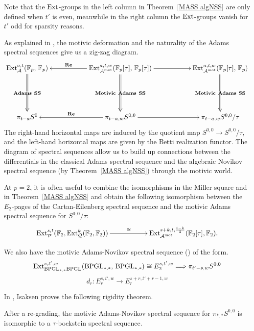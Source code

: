 \begin{rmk}  
  Note that the $\operatorname{\mathrm{Ext}}$-groups in the left column in Theorem~\ref{MASS algNSS} are only defined when $t'$ is even, meanwhile in the right column the $\operatorname{\mathrm{Ext}}$-groups vanish for $t'$ odd for sparsity reasons.
\end{rmk}

As explained in \cite[Subsection~1.3]{GWX}, the motivic deformation and the naturality of the Adams spectral sequences give us a zig-zag diagram.
\begin{displaymath}
  \xymatrix{
\Ext_{\A}^{a,t}(\F_p,\, \F_p) \ar@{=>}[dd]|{\mathbf{Adams \ SS}}  & & 
  \Ext^{a,t,w}_{\A^\textup{mot}}(\F_p[\tau],\, \F_p[\tau]) \ar[ll]_-{\mathbf{Re}} \ar[rr] \ar@{=>}[dd]|{\mathbf{Motivic \ Adams \ SS}} & & 
   \Ext^{a,t,w}_{\A^\textup{mot}}(\F_p[\tau],\, \F_p)   \ar@{=>}[dd]|{\mathbf{Motivic \ Adams \ SS}} \\
 & & & & \\
 \pi_{t-a}S^0 & & \pi_{t-a,w}S^{0,0} \ar[ll]_-{\mathbf{Re}} \ar[rr] & & \pi_{t-a,w}S^{0,0}/\tau
}
\end{displaymath}
The right-hand horizontal maps are induced by the quotient map $S^{0,0} \rightarrow S^{0,0}/\tau$, and
the left-hand horizontal maps are given by the Betti realization functor.
The diagram of spectral sequences allow us to build up connections between the differentials in the classical Adams spectral sequence and the algebraic Novikov spectral sequence (by Theorem~\ref{MASS algNSS}) through the motivic world.

\begin{rmk} \label{tridegree}
At $p=2$, it is often useful to combine the isomorphisms in the Miller square and in Theorem~\ref{MASS algNSS} and obtain the following isomorphism between the $E_2$-pages of the Cartan-Eilenberg spectral sequence and the motivic Adams spectral sequence for $S^{0,0}/\tau$:
\[\xymatrix{
  \Ext^{s,t}_{\P}(\F_2, \Ext_{\mathcal{Q}}^k(\F_2, \F_2)) \ar[rr]^-{\cong} & & \Ext^{s+k, t, \frac{t-k}{2}}_{\A^{\textup{mot}}}(\F_2[\tau], \F_2).
}\]
\end{rmk}

We also have the motivic Adams-Novikov spectral sequence (\cite{HuKrizOrmsby, Isaksen}) of the form.
$$ \operatorname{\mathrm{Ext}}_{\textup{BPGL}_{*,*}\textup{BPGL}}^{s,t',w}(\textup{BPGL}_{*,*},\, \textup{BPGL}_{*,*}) \cong E_2^{s,t',w} \Longrightarrow \pi_{t'-s,w}S^{0,0}$$
$$d_r:E_r^{s,t',w} \rightarrow E_r^{s+r, t'+r-1,w}$$

In \cite[Sections~6.1, 6.2]{Isaksen}, Isaksen proves the following rigidity theorem.
\begin{thm} \label{MANSS Isaksen}
After a re-grading, the motivic Adams-Novikov spectral sequence for $\pi_{*,*}S^{0,0}$ is isomorphic to a $\tau$-bockstein spectral sequence.
\end{thm}

